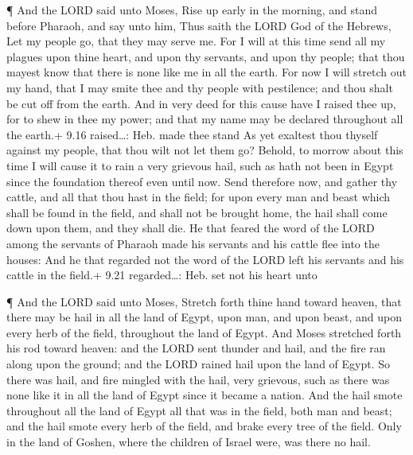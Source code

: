  ¶ And the LORD said unto Moses, Rise up early in the
morning, and stand before Pharaoh, and say unto him, Thus saith the LORD
God of the Hebrews, Let my people go, that they may serve me.
 For I will at this time send all my plagues upon thine
heart, and upon thy servants, and upon thy people; that thou mayest know
that there is none like me in all the earth.  For now I
will stretch out my hand, that I may smite thee and thy people with
pestilence; and thou shalt be cut off from the earth.  And
in very deed for this cause have I raised thee up, for to shew in thee
my power; and that my name may be declared throughout all the earth.+
9.16 raised\ldots: Heb. made thee stand  As yet exaltest
thou thyself against my people, that thou wilt not let them go?
 Behold, to morrow about this time I will cause it to rain
a very grievous hail, such as hath not been in Egypt since the
foundation thereof even until now.  Send therefore now, and
gather thy cattle, and all that thou hast in the field; for upon every
man and beast which shall be found in the field, and shall not be
brought home, the hail shall come down upon them, and they shall die.
 He that feared the word of the LORD among the servants of
Pharaoh made his servants and his cattle flee into the houses:
 And he that regarded not the word of the LORD left his
servants and his cattle in the field.+ 9.21 regarded\ldots: Heb. set not
his heart unto

 ¶ And the LORD said unto Moses, Stretch forth thine hand
toward heaven, that there may be hail in all the land of Egypt, upon
man, and upon beast, and upon every herb of the field, throughout the
land of Egypt.  And Moses stretched forth his rod toward
heaven: and the LORD sent thunder and hail, and the fire ran along upon
the ground; and the LORD rained hail upon the land of Egypt.
 So there was hail, and fire mingled with the hail, very
grievous, such as there was none like it in all the land of Egypt since
it became a nation.  And the hail smote throughout all the
land of Egypt all that was in the field, both man and beast; and the
hail smote every herb of the field, and brake every tree of the field.
 Only in the land of Goshen, where the children of Israel
were, was there no hail.

